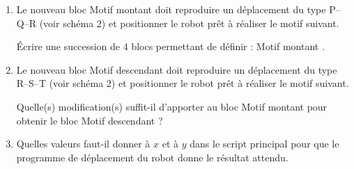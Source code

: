 \medskip

\begin{enumerate}
\item Le nouveau bloc \og Motif montant \fg{} doit reproduire un déplacement du type P--Q--R (voir schéma 2) et positionner le robot prêt à réaliser le motif suivant. 

Écrire une succession de 4 blocs permettant de définir : \og Motif montant \fg.
\item Le nouveau bloc \og Motif descendant\fg{} doit reproduire un déplacement du type R--S--T (voir schéma 2) et positionner le robot prêt à réaliser le motif suivant.

Quelle(s) modification(s) suffit-il d'apporter au bloc \og Motif montant\fg{} pour obtenir le bloc \og Motif descendant\fg{} ?
\item Quelles valeurs faut-il donner à $x$ et à $y$ dans le script principal pour que le programme de déplacement du robot donne le résultat attendu.
\end{enumerate}




